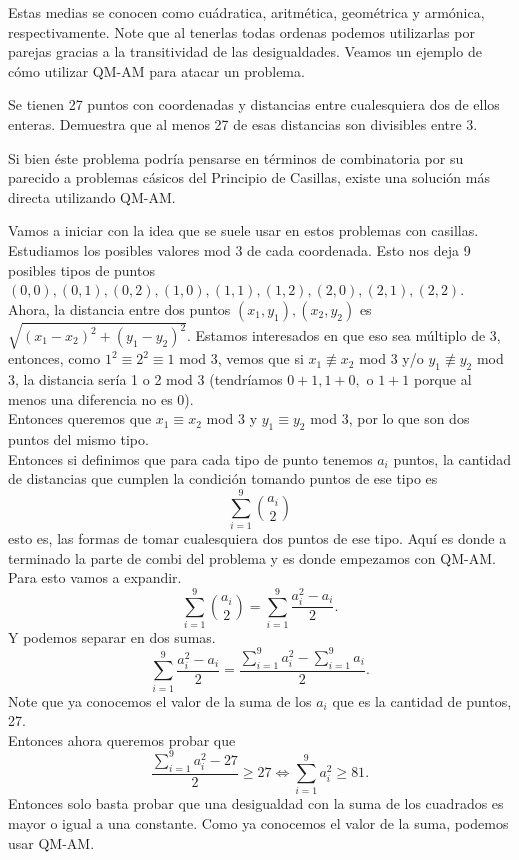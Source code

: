 \documentclass[11pt]{scrartcl}
\begin{document}
\noindent
Estas medias se conocen como cu\'adratica, aritm\'etica, geom\'etrica y arm\'onica, respectivamente. Note que al tenerlas todas ordenas podemos utilizarlas por parejas gracias a la transitividad de las desigualdades. Veamos un ejemplo de c\'omo utilizar QM-AM para atacar un problema.\\
\begin{example}
\label{JALTST2023-1.3}
Se tienen 27 puntos con coordenadas y distancias entre cualesquiera dos de ellos enteras. Demuestra que al menos 27 de esas distancias son divisibles entre 3. 
\end{example}
Si bien \'este problema podr\'ia pensarse en t\'erminos de combinatoria por su parecido a problemas c\'asicos del Principio de Casillas, existe una solución m\'as directa utilizando QM-AM. 
\begin{soln}
Vamos a iniciar con la idea que se suele usar en estos problemas con casillas. Estudiamos los posibles valores mod 3 de cada coordenada. Esto nos deja 9 posibles tipos de puntos $(0,0),(0,1),(0,2),(1,0),(1,1), (1,2),(2,0),(2,1),(2,2)$. \\

\noindent
Ahora, la distancia entre dos puntos $(x_1,y_1), (x_2,y_2)$ es $\sqrt{(x_1-x_2)^2+(y_1-y_2)^2}$. Estamos interesados en que eso sea m\'ultiplo de 3, entonces, como $1^2 \equiv 2^2 \equiv 1$ mod 3, vemos que si $x_1 \not \equiv x_2$ mod 3 y/o $y_1 \not \equiv y_2$ mod 3, la distancia ser\'ia 1 o 2 mod 3 (tendr\'iamos $ 0+1,1+0,$ o $1+1$ porque al menos una diferencia no es 0).  \\
Entonces queremos que $x_1\equiv x_2 $ mod 3 y $y_1\equiv y_2$ mod 3, por lo que son dos puntos del mismo tipo. \\

\noindent
Entonces si definimos que para cada tipo de punto tenemos $a_i$ puntos, la cantidad de distancias que cumplen la condici\'on tomando puntos de ese tipo es
$$\sum_{i=1}^9 \binom{a_i}{2}$$
esto es, las formas de tomar cualesquiera dos puntos de ese tipo. Aqu\'i es donde a terminado la parte de combi del problema y es donde empezamos con QM-AM.\\

\noindent
Para esto vamos a expandir. 
$$\sum_{i=1}^9 \binom{a_i}{2}= \sum_{i=1}^9 \frac{a_i^2-a_i}{2}.$$ 
Y podemos separar en dos sumas. 
$$ \sum_{i=1}^9 \frac{a_i^2-a_i}{2}= \frac{\sum_{i=1}^9 a_i^2- \sum_{i=1}^9 a_i }{2}.$$ 
Note que ya conocemos el valor de la suma de los $a_i$ que es la cantidad de puntos, 27.  \\
Entonces ahora queremos probar que 
$$\frac{\sum_{i=1}^9 a_i^2- 27}{2} \geq 27 \Leftrightarrow \sum_{i=1}^9 a_i^2 \geq 81.$$
Entonces solo basta probar que una desigualdad con la suma de los cuadrados es mayor o igual a una constante. Como ya conocemos el valor de la suma, podemos usar QM-AM. \\


\end{soln}
\end{document}
